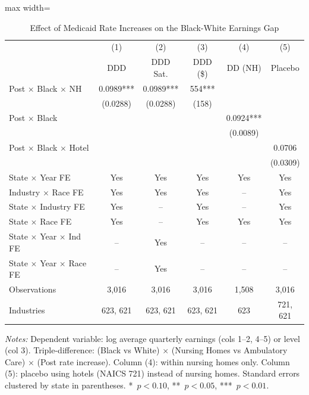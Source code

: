 
\begin{table}[t]
\centering
\caption{Effect of Medicaid Rate Increases on the Black-White Earnings Gap}
\label{tab:main}
\begin{threeparttable}
\begin{adjustbox}{max width=\textwidth}
\begin{tabular}{lccccc}
\toprule
 & (1) & (2) & (3) & (4) & (5) \\
 & DDD & DDD Sat. & DDD (\$) & DD (NH) & Placebo \\
\midrule
Post $\times$ Black $\times$ NH & 0.0989*** & 0.0989*** & 554*** & & \\
 & (0.0288) & (0.0288) & (158) & & \\[4pt]
Post $\times$ Black & & & & 0.0924*** & \\
 & & & & (0.0089) & \\[4pt]
Post $\times$ Black $\times$ Hotel & & & & & 0.0706 \\
 & & & & & (0.0309) \\[6pt]
State $\times$ Year FE & Yes & Yes & Yes & Yes & Yes \\
Industry $\times$ Race FE & Yes & Yes & Yes & -- & Yes \\
State $\times$ Industry FE & Yes & -- & Yes & -- & Yes \\
State $\times$ Race FE & Yes & -- & Yes & Yes & Yes \\
State $\times$ Year $\times$ Ind FE & -- & Yes & -- & -- & -- \\
State $\times$ Year $\times$ Race FE & -- & Yes & -- & -- & -- \\[4pt]
Observations & 3,016 & 3,016 & 3,016 & 1,508 & 3,016 \\
Industries & 623, 621 & 623, 621 & 623, 621 & 623 & 721, 621 \\
\bottomrule
\end{tabular}
\end{adjustbox}
\begin{tablenotes}[flushleft]
\small
\item \textit{Notes:} Dependent variable: log average quarterly earnings (cols 1--2, 4--5) or level (col 3).
Triple-difference: (Black vs White) $\times$ (Nursing Homes vs Ambulatory Care) $\times$ (Post rate increase).
Column (4): within nursing homes only. Column (5): placebo using hotels (NAICS 721) instead of nursing homes.
Standard errors clustered by state in parentheses.
*~$p<0.10$, **~$p<0.05$, ***~$p<0.01$.
\end{tablenotes}
\end{threeparttable}
\end{table}


